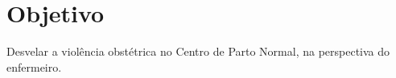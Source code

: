 \chapter{Objetivo}
\label{sec:objetivos}

Desvelar a violência obstétrica no Centro de Parto Normal, na perspectiva do enfermeiro.